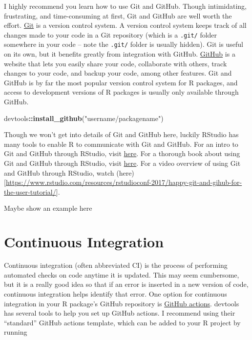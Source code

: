 \documentclass[
]{book}
\newenvironment{Shaded}{\begin{snugshade}}{\end{snugshade}}
\newcommand{\KeywordTok}[1]{\textcolor[rgb]{0.13,0.29,0.53}{\textbf{#1}}}
\newcommand{\NormalTok}[1]{#1}
\newcommand{\OperatorTok}[1]{\textcolor[rgb]{0.81,0.36,0.00}{\textbf{#1}}}
\newcommand{\StringTok}[1]{\textcolor[rgb]{0.31,0.60,0.02}{#1}}
\begin{document}
I highly recommend you learn how to use Git and GitHub. Though intimidating, frustrating, and time-consuming at first, Git and GitHub are well worth the effort. \href{https://git-scm.com/}{Git} is a version control system. A version control system keeps track of all changes made to your code in a Git repository (which is a \texttt{.git/} folder somewhere in your code -- note the \texttt{.git/} folder is usually hidden). Git is useful on its own, but it benefits greatly from integration with GitHub. \href{https://github.com/}{GitHub} is a website that lets you easily share your code, collaborate with others, track changes to your code, and backup your code, among other features. Git and GitHub is by far the most popular version control system for R packages, and access to development versions of R packages is usually only available through GitHub.

\begin{Shaded}
\begin{Highlighting}[]
\NormalTok{devtools}\OperatorTok{::}\KeywordTok{install_github}\NormalTok{(}\StringTok{"username/packagename"}\NormalTok{)}
\end{Highlighting}
\end{Shaded}

Though we won't get into details of Git and GitHub here, luckily RStudio has many tools to enable R to communicate with Git and GitHub. For an intro to Git and GitHub through RStudio, visit \href{https://r-pkgs.org/git.html}{here}. For a thorough book about using Git and GitHub through RStudio, visit \href{https://happygitwithr.com/}{here}. For a video overview of using Git and GitHub through RStudio, watch (here){[}\url{https://www.rstudio.com/resources/rstudioconf-2017/happy-git-and-gihub-for-the-user-tutorial/}{]}.

Maybe show an example here

\hypertarget{ci}{%
\section{Continuous Integration}\label{ci}}

Continuous integration (often abbreviated CI) is the process of performing automated checks on code anytime it is updated. This may seem cumbersome, but it is a really good idea so that if an error is inserted in a new version of code, continuous integration helps identify that error. One option for continuous integration in your R package's GitHub repository is \href{https://github.com/features/actions}{GitHub actions}. devtools has several tools to help you set up GitHub actions. I recommend using their ``standard'' GitHub actions template, which can be added to your R project by running
\end{document}
